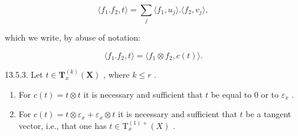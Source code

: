 \[
\langle f _ {1}. f _ {2}, t \rangle = \sum_ {j} \langle f _ {1}, u _ {j} \rangle . \langle f _ {2}, v _ {j} \rangle ,
\]

which we write, by abuse of notation:

\[
\langle f _ {1}. f _ {2}, t \rangle = \langle f _ {1} \otimes f _ {2}, c (t) \rangle .
\]

13.5.3. Let \(t \in \mathbf{T}_x^{(k)}(\mathbf{X})\) , where \(k \leqslant r\) .

\begin{enumerate}
\def\labelenumi{\alph{enumi})}
\item
  For \(c(t)=t\otimes t\) it is necessary and sufficient that \(t\) be equal to 0 or to \(\varepsilon_{x}\) .
\item
  For \(c(t)=t\otimes\varepsilon_{x}+\varepsilon_{x}\otimes t\) it is necessary and sufficient that \(t\) be a tangent vector, i.e., that one has \(t\in\mathrm{T}_{x}^{(1)+}(X)\) .
\end{enumerate}

